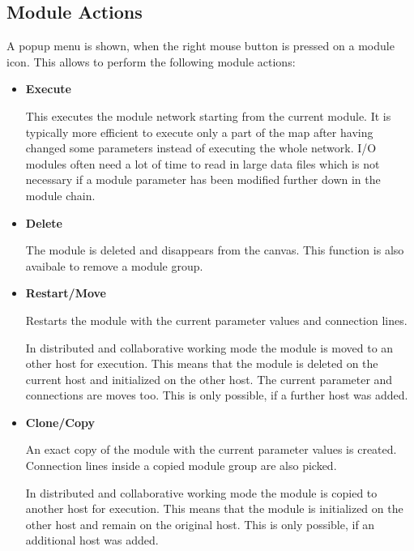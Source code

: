 	 \subsection{Module Actions}
	 \label{actions}
    
	 A popup menu is shown, when the right mouse button is 
	 pressed on a module icon. This allows to 
	 perform the following module actions:  




	 \begin{itemize}
	 \item {\bf Execute}

	 This executes the module network starting from the current module. It is typically 
	 more efficient to execute only a part of the map after having changed some parameters
	 instead of executing the whole network. I/O modules often need a lot of time to read in large
	 data files which is not necessary if a module parameter has been modified further 
	 down in the module chain.
	 
	 \item {\bf Delete} 

	 The module is deleted and disappears from the canvas. This function is also avaibale to remove a module group. 
	
	 \item {\bf Restart/Move} 
    
    Restarts the module with the current parameter values and connection lines.
    
    In distributed and collaborative working mode the module is moved to an other host 
    for execution. This means that the module is deleted on the current host and initialized 
	 on the other host. The current parameter and connections are moves too. This is only possible, 
	 if a further host was added.
	 
	 \item {\bf Clone/Copy} 

	 An exact copy of the module with the current parameter values is created. Connection lines 
    inside a copied module group are also picked.
    
    In distributed and collaborative working mode the module is copied to another host 
    for execution. This means that the module is initialized on the other host and remain on the original host. 
	 This is only possible, if an  additional host was added.
			

\end{itemize}

